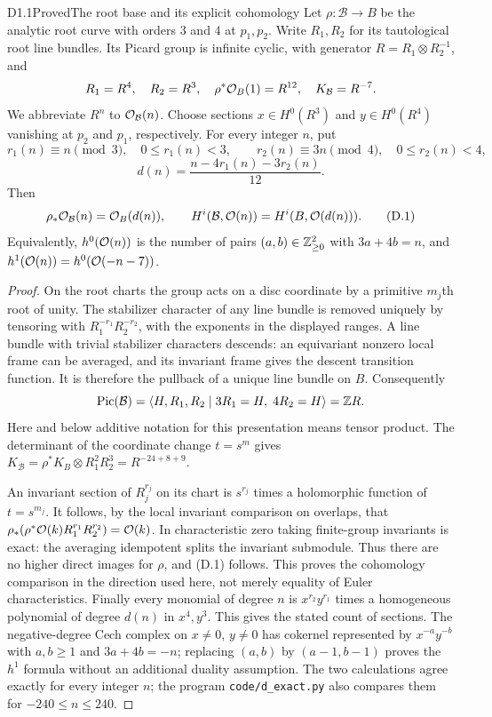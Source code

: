 \begin{claim}{D1.1}{Proved}{The root base and its explicit cohomology}
Let $\rho:\mathcal B\to B$ be the analytic root curve with orders $3$ and
$4$ at $p_1,p_2$. Write $R_1,R_2$ for its tautological root line bundles.
Its Picard group is infinite cyclic, with generator
$R=R_1\otimes R_2^{-1}$, and
\[
 R_1=R^4,\quad R_2=R^3,\quad \rho^*\mathcal O_B(1)=R^{12},
 \quad K_{\mathcal B}=R^{-7}.
\]
We abbreviate $R^n$ to $\mathcal O_{\mathcal B}(n)$. Choose sections
$x\in H^0(R^3)$ and $y\in H^0(R^4)$ vanishing at $p_2$ and $p_1$,
respectively. For every integer $n$, put
\[
 r_1(n)\equiv n\pmod3,\quad 0\le r_1(n)<3,
 \qquad r_2(n)\equiv3n\pmod4,\quad0\le r_2(n)<4,
\]
\[
 d(n)=\frac{n-4r_1(n)-3r_2(n)}{12}.
\]
Then
\[
 \rho_*\mathcal O_{\mathcal B}(n)=\mathcal O_B(d(n)),\qquad
 H^i(\mathcal B,\mathcal O(n))=H^i(B,\mathcal O(d(n))).                 \tag{D.1}
\]
Equivalently, $h^0(\mathcal O(n))$ is the number of pairs
$(a,b)\in\mathbb Z_{\ge0}^2$ with $3a+4b=n$, and
$h^1(\mathcal O(n))=h^0(\mathcal O(-n-7))$.
\end{claim}
\begin{proof}
On the root charts the group acts on a disc coordinate by a primitive
$m_j$th root of unity. The stabilizer character of any line bundle is
removed uniquely by tensoring with $R_1^{-r_1}R_2^{-r_2}$, with the
exponents in the displayed ranges. A line bundle with trivial stabilizer
characters descends: an equivariant nonzero local frame can be averaged,
and its invariant frame gives the descent transition function. It is
therefore the pullback of a unique line bundle on $B$. Consequently
\[
 \operatorname{Pic}(\mathcal B)=
 \langle H,R_1,R_2\mid 3R_1=H,\;4R_2=H\rangle=\mathbb Z R.
\]
Here and below additive notation for this presentation means tensor
product. The determinant of the coordinate change $t=s^m$ gives
$K_{\mathcal B}=\rho^*K_B\otimes R_1^2R_2^3=R^{-24+8+9}$.

An invariant section of $R_j^{r_j}$ on its chart is $s^{r_j}$ times a
holomorphic function of $t=s^{m_j}$. It follows, by the local invariant
comparison on overlaps, that
$\rho_*(\rho^*\mathcal O(k)R_1^{r_1}R_2^{r_2})=\mathcal O(k)$.
In characteristic zero taking finite-group invariants is exact: the
averaging idempotent splits the invariant submodule. Thus there are no
higher direct images for $\rho$, and (D.1) follows. This proves the
cohomology comparison in the direction used here, not merely equality
of Euler characteristics. Finally every monomial of degree $n$ is
$x^{r_2}y^{r_1}$ times a homogeneous polynomial of degree $d(n)$ in
$x^4,y^3$. This gives the stated count of sections. The negative-degree
Cech complex on $x\ne0$, $y\ne0$ has cokernel represented by
$x^{-a}y^{-b}$ with $a,b\ge1$ and $3a+4b=-n$; replacing $(a,b)$ by
$(a-1,b-1)$ proves the $h^1$ formula without an additional duality
assumption. The two calculations agree exactly for every integer $n$;
the program \texttt{code/d\_exact.py} also compares them for
$-240\le n\le240$.
\end{proof}

